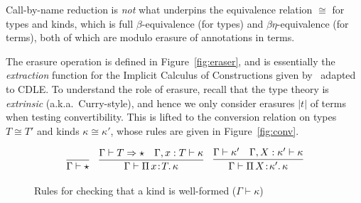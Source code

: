 \documentclass{article}
\newcommand{\abs}[4]{{#1}\, #2\! : \! #3.\, #4}
\newcommand{\tpsynth}[0]{\Rightarrow}
\begin{document}
Call-by-name reduction is \emph{not} what underpins the
equivalence relation \(\cong\) for types and kinds, which is full
\(\beta\)-equivalence (for types) and \(\beta\eta\)-equivalence (for terms),
both of which are modulo erasure of annotations in terms.

The erasure operation is defined in Figure~\ref{fig:eraser}, and is essentially
the \emph{extraction} function for the Implicit Calculus of Constructions given
by~\cite{BB08_ICC-as-a-Programming-Language} adapted to CDLE.
To understand the role of erasure, recall that the type theory is \emph{extrinsic} (a.k.a.\
Curry-style), and hence we only consider erasures \(|t|\) of terms when testing
convertibility.
This is lifted to the conversion relation on types \(T \cong T'\) and kinds
\(\kappa \cong \kappa'\), whose rules are given in
Figure~\ref{fig:conv}.

\begin{figure}
  \[
  \begin{array}{ccc}
    \infer{\Gamma \vdash \star}{\ } &
    \infer{\Gamma\vdash\abs{\Pi}{x}{T}{\kappa}}{\Gamma \vdash T \tpsynth \star & \Gamma,x:T\vdash\kappa} &
    \infer{\Gamma\vdash\abs{\Pi}{X}{\kappa'}{\kappa}}{\Gamma \vdash \kappa' & \Gamma,X:\kappa'\vdash\kappa}
  \end{array}
  \]
  \caption{Rules for checking that a kind is well-formed ($\Gamma \vdash \kappa$)}
  \label{fig:superknd}
\end{figure}
\end{document}
